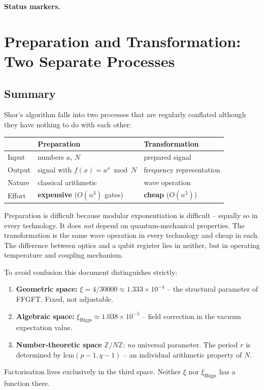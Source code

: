 
\medskip\noindent\textbf{Status markers.}


\section{Preparation and Transformation: Two Separate Processes}

\subsection*{Summary}

Shor's algorithm falls into two processes that are regularly conflated
although they have nothing to do with each other:

\begin{center}
\begin{tabular}{lll}
\toprule
 & \textbf{Preparation} & \textbf{Transformation} \\
\midrule
Input & numbers $a$, $N$ & prepared signal \\
Output & signal with $f(x) = a^x \bmod N$ & frequency representation \\
Nature & classical arithmetic & wave operation \\
Effort & \textbf{expensive} ($O(n^3)$ gates) & \textbf{cheap} ($O(n^2)$) \\
\bottomrule
\end{tabular}
\end{center}

Preparation is difficult because modular exponentiation is difficult --
equally so in every technology. It does \emph{not} depend on
quantum-mechanical properties. The transformation is the same wave
operation in every technology and cheap in each. The difference between
optics and a qubit register lies in neither, but in operating
temperature and coupling mechanism.

\begin{keyresult}
To avoid confusion this document distinguishes strictly:
\begin{enumerate}
  \item \textbf{Geometric space:} $\xi = 4/30000 \approx 1.333\times10^{-4}$ --
    the structural parameter of FFGFT. Fixed, not adjustable.
  \item \textbf{Algebraic space:} $\xi_{\text{Higgs}} \approx
    1.038\times10^{-5}$ -- field correction in the vacuum expectation value.
  \item \textbf{Number-theoretic space} $\mathbb{Z}/N\mathbb{Z}$: \emph{no}
    universal parameter. The period $r$ is determined by
    $\mathrm{lcm}(p-1,q-1)$ -- an individual arithmetic property of $N$.
\end{enumerate}
Factorisation lives exclusively in the third space. Neither $\xi$ nor
$\xi_{\text{Higgs}}$ has a function there.
\end{keyresult}

